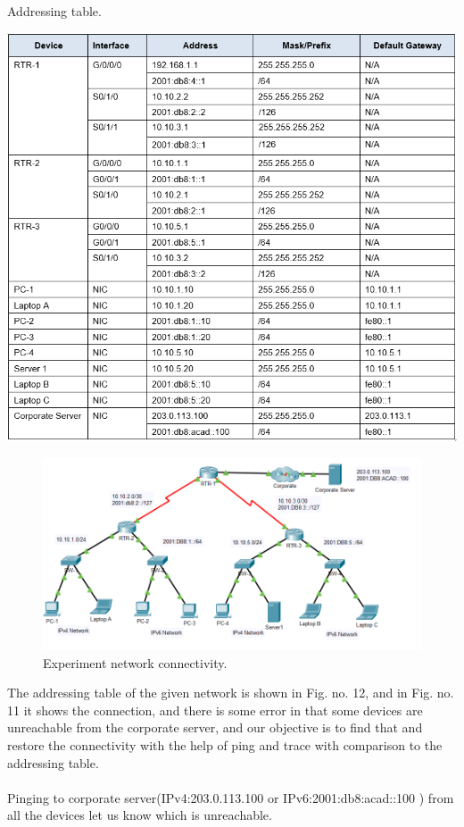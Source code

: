 \documentclass[12pt,a4paper]{article}
\begin{document}
\begin{table}[h!]
\begin{center}
\centering
\caption{Addressing table.}
\includegraphics[scale=0.75]{5.13.png}	
\end{center}
\end{table}
\begin{figure}[h]
 		\centering
				\includegraphics[scale=0.75]{5.1.png}	


			\caption{Experiment network connectivity.}
			\label{fig:AP}
	\end{figure}
The addressing table of the given network is shown in Fig. no. 12, and in Fig. no. 11 it shows the connection, and there is some error in that some devices are unreachable from the corporate server, and our objective is to find that and restore the connectivity with the help of ping and trace with comparison to the addressing table.\\
\pagebreak\\
Pinging to corporate server(IPv4:203.0.113.100 or IPv6:2001:db8:acad::100 ) from all the devices let us know which is unreachable.
\end{document}
